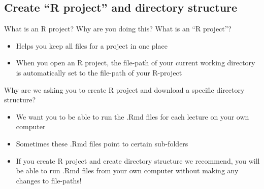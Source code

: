 \documentclass[
  8pt,
  ignorenonframetext,
  dvipsnames]{beamer}
\providecommand{\tightlist}{%
  \setlength{\itemsep}{0pt}\setlength{\parskip}{0pt}}
\let\olditem\item
\renewcommand{\item}{%
  \olditem\vspace{4pt}
}
\begin{document}
\hypertarget{create-r-project-and-directory-structure}{%
\subsection{Create ``R project'' and directory
structure}\label{create-r-project-and-directory-structure}}

\begin{frame}{What is an R project? Why are you doing this?}
\protect\hypertarget{what-is-an-r-project-why-are-you-doing-this}{}
What is an ``R project''?

\begin{itemize}
\tightlist
\item
  Helps you keep all files for a project in one place
\item
  When you open an R project, the file-path of your current working
  directory is automatically set to the file-path of your R-project
\end{itemize}

Why are we asking you to create R project and download a specific
directory structure?

\begin{itemize}
\tightlist
\item
  We want you to be able to run the .Rmd files for each lecture on your
  own computer
\item
  Sometimes these .Rmd files point to certain sub-folders
\item
  If you create R project and create directory structure we recommend,
  you will be able to run .Rmd files from your own computer without
  making any changes to file-paths!
\end{itemize}
\end{frame}
\end{document}
